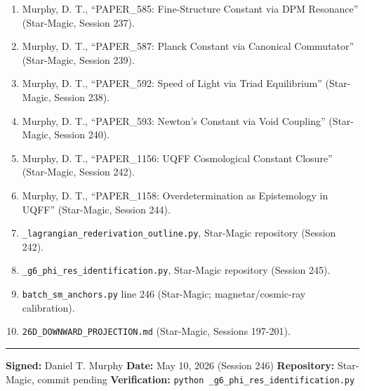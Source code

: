 \documentclass[
]{article}
\providecommand{\tightlist}{%
  \setlength{\itemsep}{0pt}\setlength{\parskip}{0pt}}
\begin{document}
\begin{enumerate}
\def\labelenumi{\arabic{enumi}.}
\tightlist
\item
  Murphy, D. T., ``PAPER\_585: Fine-Structure Constant via DPM
  Resonance'' (Star-Magic, Session 237).
\item
  Murphy, D. T., ``PAPER\_587: Planck Constant via Canonical
  Commutator'' (Star-Magic, Session 239).
\item
  Murphy, D. T., ``PAPER\_592: Speed of Light via Triad Equilibrium''
  (Star-Magic, Session 238).
\item
  Murphy, D. T., ``PAPER\_593: Newton's Constant via Void Coupling''
  (Star-Magic, Session 240).
\item
  Murphy, D. T., ``PAPER\_1156: UQFF Cosmological Constant Closure''
  (Star-Magic, Session 242).
\item
  Murphy, D. T., ``PAPER\_1158: Overdetermination as Epistemology in
  UQFF'' (Star-Magic, Session 244).
\item
  \texttt{\_lagrangian\_rederivation\_outline.py}, Star-Magic repository
  (Session 242).
\item
  \texttt{\_g6\_phi\_res\_identification.py}, Star-Magic repository
  (Session 245).
\item
  \texttt{batch\_sm\_anchors.py} line 246 (Star-Magic;
  magnetar/cosmic-ray calibration).
\item
  \texttt{26D\_DOWNWARD\_PROJECTION.md} (Star-Magic, Sessions 197-201).
\end{enumerate}

\begin{center}\rule{0.5\linewidth}{0.5pt}\end{center}

\textbf{Signed:} Daniel T. Murphy \textbf{Date:} May 10, 2026 (Session
246) \textbf{Repository:} Star-Magic, commit pending
\textbf{Verification:}
\texttt{python\ \_g6\_phi\_res\_identification.py}




\end{document}
